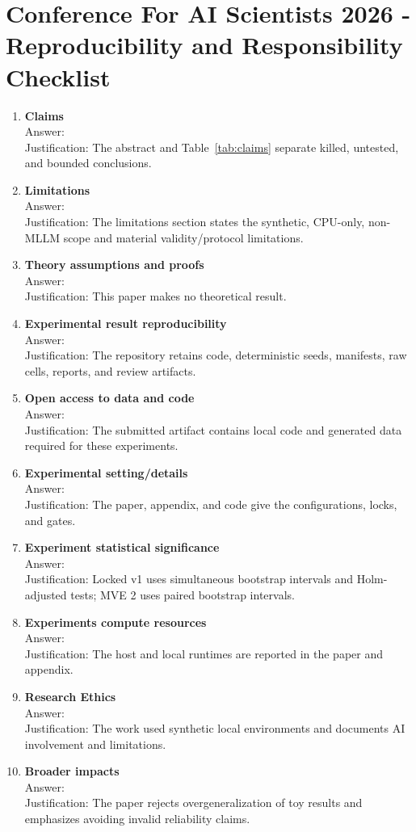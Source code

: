 \documentclass{article}
\begin{document}
\newpage
\section*{Conference For AI Scientists 2026 - Reproducibility and Responsibility Checklist}
\begin{enumerate}
\item \textbf{Claims}\\ Answer: \answerYes{}\\ Justification: The abstract and Table~\ref{tab:claims} separate killed, untested, and bounded conclusions.
\item \textbf{Limitations}\\ Answer: \answerYes{}\\ Justification: The limitations section states the synthetic, CPU-only, non-MLLM scope and material validity/protocol limitations.
\item \textbf{Theory assumptions and proofs}\\ Answer: \answerNA{}\\ Justification: This paper makes no theoretical result.
\item \textbf{Experimental result reproducibility}\\ Answer: \answerYes{}\\ Justification: The repository retains code, deterministic seeds, manifests, raw cells, reports, and review artifacts.
\item \textbf{Open access to data and code}\\ Answer: \answerYes{}\\ Justification: The submitted artifact contains local code and generated data required for these experiments.
\item \textbf{Experimental setting/details}\\ Answer: \answerYes{}\\ Justification: The paper, appendix, and code give the configurations, locks, and gates.
\item \textbf{Experiment statistical significance}\\ Answer: \answerYes{}\\ Justification: Locked v1 uses simultaneous bootstrap intervals and Holm-adjusted tests; MVE 2 uses paired bootstrap intervals.
\item \textbf{Experiments compute resources}\\ Answer: \answerYes{}\\ Justification: The host and local runtimes are reported in the paper and appendix.
\item \textbf{Research Ethics}\\ Answer: \answerYes{}\\ Justification: The work used synthetic local environments and documents AI involvement and limitations.
\item \textbf{Broader impacts}\\ Answer: \answerYes{}\\ Justification: The paper rejects overgeneralization of toy results and emphasizes avoiding invalid reliability claims.
\end{enumerate}
\end{document}
